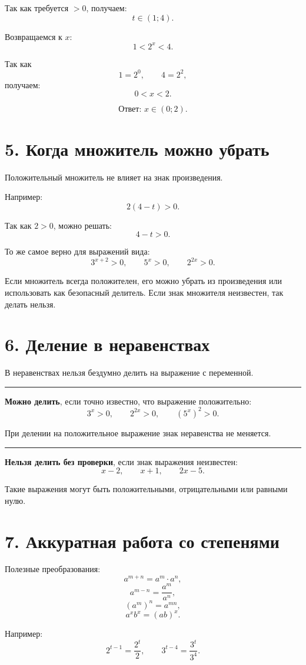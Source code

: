 \documentclass[a4paper,12pt]{article}
\newcommand{\answer}[1]{\textbf{Ответ: }#1}
\newcommand{\sectionline}{%
  \vspace{2mm}
  \noindent\textcolor{lightline}{\rule{\linewidth}{0.8pt}}
  \vspace{1mm}
}
\begin{document}
Так как требуется \(>0\), получаем:
\[
t\in(1;4).
\]

Возвращаемся к \(x\):
\[
1<2^x<4.
\]

Так как
\[
1=2^0,\qquad 4=2^2,
\]
получаем:
\[
0<x<2.
\]

\[
\answer{\displaystyle x\in(0;2).}
\]

\section*{5. Когда множитель можно убрать}

Положительный множитель не влияет на знак произведения.

Например:
\[
2(4-t)>0.
\]

Так как \(2>0\), можно решать:
\[
4-t>0.
\]

То же самое верно для выражений вида:
\[
3^{x+2}>0,\qquad 5^x>0,\qquad 2^{2x}>0.
\]

Если множитель всегда положителен, его можно убрать из произведения или использовать как безопасный делитель. Если знак множителя неизвестен, так делать нельзя.

\section*{6. Деление в неравенствах}

В неравенствах нельзя бездумно делить на выражение с переменной.

\sectionline

\textbf{Можно делить}, если точно известно, что выражение положительно:
\[
3^x>0,\qquad 2^{2x}>0,\qquad (5^x)^2>0.
\]

При делении на положительное выражение знак неравенства не меняется.

\sectionline

\textbf{Нельзя делить без проверки}, если знак выражения неизвестен:
\[
x-2,\qquad x+1,\qquad 2x-5.
\]

Такие выражения могут быть положительными, отрицательными или равными нулю.

\section*{7. Аккуратная работа со степенями}

Полезные преобразования:
\[
a^{m+n}=a^m\cdot a^n,
\]
\[
a^{m-n}=\frac{a^m}{a^n},
\]
\[
(a^m)^n=a^{mn},
\]
\[
a^x b^x=(ab)^x.
\]

Например:
\[
2^{t-1}=\frac{2^t}{2},
\qquad
3^{t-4}=\frac{3^t}{3^4}.
\]
\end{document}

